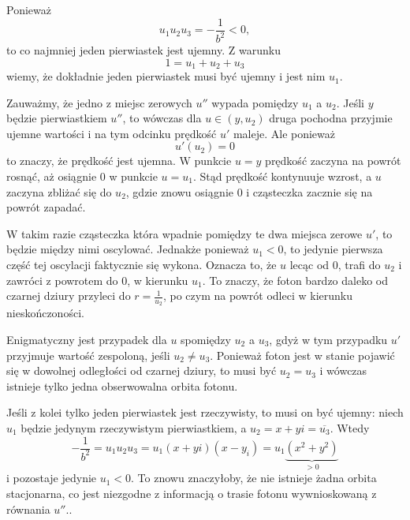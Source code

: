 Ponieważ 
$$u_1u_2u_3=-\frac{1}{b^2}<0,$$ 
to co najmniej jeden pierwiastek jest ujemny. Z warunku 
$$1=u_1+u_2+u_3$$ 
wiemy, że dokładnie jeden pierwiastek musi być ujemny i jest nim $u_1$. 

Zauważmy, że jedno z miejsc zerowych $u''$ wypada pomiędzy $u_1$ a $u_2$. Jeśli $y$ będzie pierwiastkiem $u''$, to wówczas dla $u\in (y, u_2)$ druga pochodna przyjmie ujemne wartości i na tym odcinku prędkość $u'$ maleje. Ale ponieważ 
$$u'(u_2)=0$$
to znaczy, że prędkość jest ujemna. W punkcie $u=y$ prędkość zaczyna na powrót rosnąć, aż osiągnie $0$ w punkcie $u=u_1$. Stąd prędkość kontynuuje wzrost, a $u$ zaczyna zbliżać się do $u_2$, gdzie znowu osiągnie $0$ i cząsteczka zacznie się na powrót zapadać.

W takim razie cząsteczka która wpadnie pomiędzy te dwa miejsca zerowe $u'$, to będzie między nimi oscylować. Jednakże ponieważ $u_1<0$, to jedynie pierwsza część tej oscylacji faktycznie się wykona. Oznacza to, że $u$ lecąc od $0$, trafi do $u_2$ i zawróci z powrotem do $0$, w kierunku $u_1$. To znaczy, że foton bardzo daleko od czarnej dziury przyleci do $r=\frac{1}{u_2}$, po czym na powrót odleci w kierunku nieskończoności.

Enigmatyczny jest przypadek dla $u$ spomiędzy $u_2$ a $u_3$, gdyż w tym przypadku $u'$ przyjmuje wartość zespoloną, jeśli $u_2\neq u_3$. Ponieważ foton jest w stanie pojawić się w dowolnej odległości od czarnej dziury, to musi być $u_2=u_3$ i wówczas istnieje tylko jedna obserwowalna orbita fotonu.

Jeśli z kolei tylko jeden pierwiastek jest rzeczywisty, to musi on być ujemny: niech $u_1$ będzie jedynym rzeczywistym pierwiastkiem, a $u_2=x+yi=\overline{u_3}$. Wtedy
$$-\frac{1}{b^2}=u_1u_2u_3=u_1(x+yi)(x-y_i)=u_1\underbrace{(x^2+y^2)}_{>0}$$
i pozostaje jedynie $u_1<0$. To znowu znaczyłoby, że nie istnieje żadna orbita stacjonarna, co jest niezgodne z informacją o trasie fotonu wywnioskowaną z równania $u''$..
